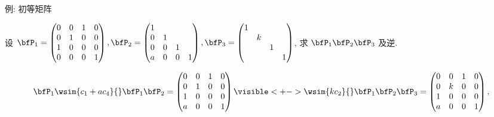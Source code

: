 \begin{frame}{例: 初等矩阵}\small
\beqskip{0pt}
	\onslide<+->
	\begin{example}
		设 $\bfP_1=\begin{pmatrix}
			0&0&1&0\\
			0&1&0&0\\
			1&0&0&0\\
			0&0&0&1
		\end{pmatrix},\bfP_2=\begin{pmatrix}
			1&&&\\
			0&1&&\\
			0&0&1&\\
			a&0&0&1
		\end{pmatrix},\bfP_3=\begin{pmatrix}
			1&&&\\
			&k&&\\
			&&1&\\
			&&&1
		\end{pmatrix}$, 求 $\bfP_1\bfP_2\bfP_3$ 及逆.
	\end{example}
	\onslide<+->
	\begin{solution}
		\[\bfP_1\wsim{c_1+ac_4}{}\bfP_1\bfP_2=\begin{pmatrix}
			0&0&1&0\\
			0&1&0&0\\
			1&0&0&0\\
			a&0&0&1
		\end{pmatrix}\visible<+->{\wsim{kc_2}{}
		\bfP_1\bfP_2\bfP_3=\begin{pmatrix}
			0&0&1&0\\
			0&k&0&0\\
			1&0&0&0\\
			a&0&0&1
		\end{pmatrix},}\]
		\onslide<+->{%
		\[\bfP_1^{-1}=\bfP_1\!\!\wsim{r_4-ar_1}{}\!\!
		(\bfP_1\bfP_2)^{-1}=\begin{pmatrix}
			0&0&1&0\\
			0&1&0&0\\
			1&0&0&0\\
			0&0&-a&1
		\end{pmatrix}\visible<+->{\!\!\wsim{\dfrac1k r_2}{}\!\!
		(\bfP_1\bfP_2\bfP_3)^{-1}=\begin{pmatrix}
			0&0&1&0\\
			0&1/k&0&0\\
			1&0&0&0\\
			0&0&-a&1
		\end{pmatrix}.}\]}
		\vspace{-.5\baselineskip}
	\end{solution}
\endgroup
\end{frame}


